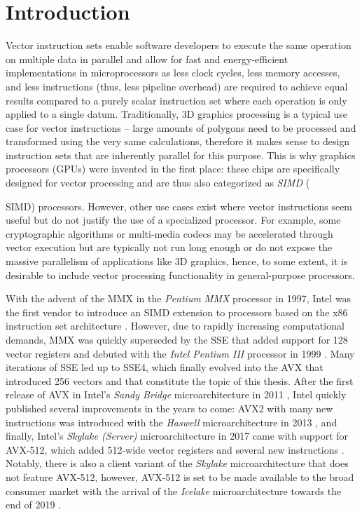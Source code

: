 \chapter{Introduction}
\label{sec:introduction}

Vector instruction sets enable software developers to execute the same operation on multiple data in parallel and allow for fast and energy-efficient implementations in microprocessors as less clock cycles, less memory accesses, and less instructions (thus, less pipeline overhead) are required to achieve equal results compared to a purely scalar instruction set where each operation is only applied to a single datum. Traditionally, 3D graphics processing is a typical use case for vector instructions -- large amounts of polygons need to be processed and transformed using the very same calculations, therefore it makes sense to design instruction sets that are inherently parallel for this purpose. This is why graphics processors (\glspl{GPU}) were invented in the first place: these chips are specifically designed for vector processing and are thus also categorized as \textit{\acrlong{SIMD}} ({\acrshort{SIMD}) processors. However, other use cases exist where vector instructions seem useful but do not justify the use of a specialized processor. For example, some cryptographic algorithms or multi-media codecs may be accelerated through vector execution but are typically not run long enough or do not expose the massive parallelism of applications like 3D graphics, hence, to some extent, it is desirable to include vector processing functionality in general-purpose processors.

With the advent of the \gls{MMX} in the \textit{Pentium MMX} processor in 1997, Intel was the first vendor to introduce an \gls{SIMD} extension to processors based on the x86 instruction set architecture \cite{intelmmx}. However, due to rapidly increasing computational demands, \gls{MMX} was quickly superseded by the \gls{SSE} that added support for \SI{128}{\bit} vector registers and debuted with the \textit{Intel Pentium III} processor in 1999 \cite{intelsse}. Many iterations of \gls{SSE} led up to SSE4, which finally evolved into the \gls{AVX} that introduced \SI{256}{\bit} vectors and that constitute the topic of this thesis. After the first release of \gls{AVX} in Intel's \textit{Sandy Bridge} microarchitecture in 2011 \cite{intelsandybridge}, Intel quickly published several improvements in the years to come: \gls{AVX2} with many new instructions was introduced with the \textit{Haswell} microarchitecture in 2013 \cite{hammarlund2014haswell}, and finally, Intel's \textit{Skylake (Server)} microarchitecture in 2017 came with support for \gls{AVX-512}, which added \SI{512}{\bit}-wide vector registers and several new instructions \cite{intelxeonscalabledeepdive}. Notably, there is also a client variant of the \textit{Skylake} microarchitecture that does not feature \gls{AVX-512}, however, \gls{AVX-512} is set to be made available to the broad consumer market with the arrival of the \textit{Icelake} microarchitecture towards the end of 2019 \cite{thicelake}.

}
